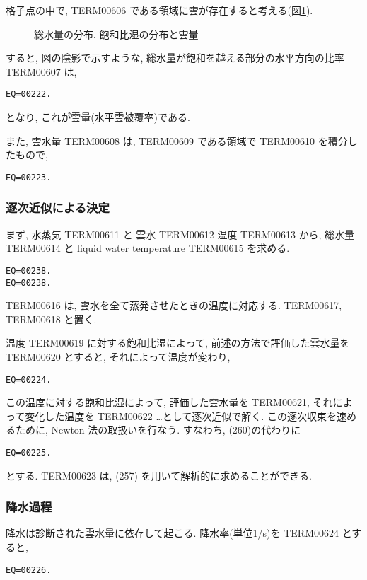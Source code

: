 格子点の中で,
TERM00606 である領域に雲が存在すると考える(図\ref{lsc:fig-cloud}).

\begin{figure}[hbtp]
  \begin{center}
  \end{center}
  \caption{総水量の分布, 飽和比湿の分布と雲量}
  \label{lsc:fig-cloud}
\end{figure}


すると, 図の陰影で示すような,
総水量が飽和を越える部分の水平方向の比率 TERM00607 は,
\begin{verbatim}
EQ=00222.
\end{verbatim}
となり, これが雲量(水平雲被覆率)である.

また, 雲水量 TERM00608 は, TERM00609 である領域で
TERM00610 を積分したもので,
\begin{verbatim}
EQ=00223.
\end{verbatim}

\subsubsection{逐次近似による決定}

まず, 水蒸気 TERM00611 と 雲水 TERM00612 温度 TERM00613 から,
総水量 TERM00614 と liquid water temperature TERM00615 を求める.
\begin{verbatim}
EQ=00238.
EQ=00238.
\end{verbatim}
TERM00616 は, 雲水を全て蒸発させたときの温度に対応する.
TERM00617, TERM00618 と置く.

温度 TERM00619 に対する飽和比湿によって, 
前述の方法で評価した雲水量を TERM00620 とすると,
それによって温度が変わり,
\begin{verbatim}
EQ=00224.
\end{verbatim}
この温度に対する飽和比湿によって, 評価した雲水量を TERM00621,
それによって変化した温度を TERM00622 \ldots として逐次近似で解く.
この逐次収束を速めるために, Newton 法の取扱いを行なう.
すなわち, (260)の代わりに
\begin{verbatim}
EQ=00225.
\end{verbatim}
とする.
TERM00623 は, (257) を用いて解析的に求めることができる.

\subsubsection{降水過程}

降水は診断された雲水量に依存して起こる.
降水率(単位1/s)を TERM00624 とすると,
\begin{verbatim}
EQ=00226.
\end{verbatim}

